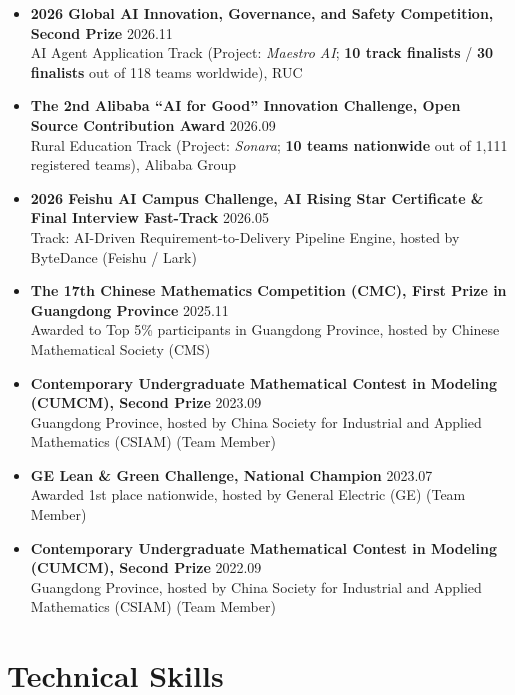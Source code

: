 \documentclass[10pt,letterpaper]{article}
\begin{document}
\begin{itemize}
  \item \textbf{2026 Global AI Innovation, Governance, and Safety Competition, Second Prize} \hfill 2026.11 \\
  AI Agent Application Track (Project: \emph{Maestro AI}; \textbf{10 track finalists} / \textbf{30 finalists} out of 118 teams worldwide), RUC

  \item \textbf{The 2nd Alibaba ``AI for Good'' Innovation Challenge, Open Source Contribution Award} \hfill 2026.09 \\
  Rural Education Track (Project: \emph{Sonara}; \textbf{10 teams nationwide} out of 1,111 registered teams), Alibaba Group

  \item \textbf{2026 Feishu AI Campus Challenge, AI Rising Star Certificate \& Final Interview Fast-Track} \hfill 2026.05 \\
  Track: AI-Driven Requirement-to-Delivery Pipeline Engine, hosted by ByteDance (Feishu / Lark)

  \item \textbf{The 17th Chinese Mathematics Competition (CMC), First Prize in Guangdong Province} \hfill 2025.11 \\
  Awarded to Top 5\% participants in Guangdong Province, hosted by Chinese Mathematical Society (CMS)

  \item \textbf{Contemporary Undergraduate Mathematical Contest in Modeling (CUMCM), Second Prize} \hfill 2023.09 \\
  Guangdong Province, hosted by China Society for Industrial and Applied Mathematics (CSIAM) (Team Member)

  \item \textbf{GE Lean \& Green Challenge, National Champion} \hfill 2023.07 \\
  Awarded 1st place nationwide, hosted by General Electric (GE) (Team Member)

  \item \textbf{Contemporary Undergraduate Mathematical Contest in Modeling (CUMCM), Second Prize} \hfill 2022.09 \\
  Guangdong Province, hosted by China Society for Industrial and Applied Mathematics (CSIAM) (Team Member)
\end{itemize}

\section{Technical Skills}
\end{document}
